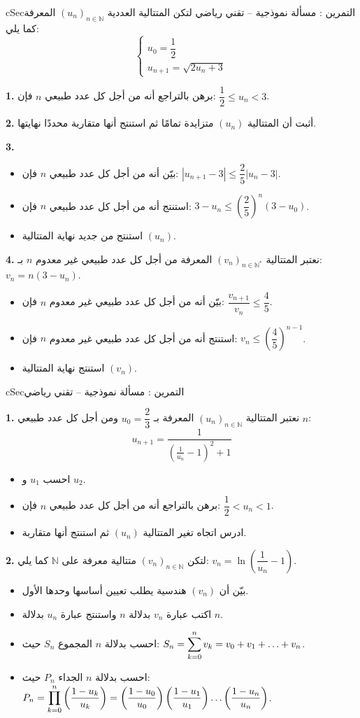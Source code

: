 \documentclass[12pt,a4paper]{article}
\newenvironment{BOX}[2]{\begin{otherlanguage}{english}\begin{arbox}{#1}{#2}}{\end{arbox}\end{otherlanguage}}
\newcounter{exo}
\newenvironment{tamrin}[1]{\stepcounter{exo}\begin{BOX}{cSec}{التمرين \theexo: #1}}{\end{BOX}}
\renewcommand{\dots}{\mathinner{\ldotp\ldotp\ldotp}}
\newcommand{\N}{\mathbb{N}}
\newenvironment{sq}{\begin{itemize}[leftmargin=2.4em,itemsep=3pt]}{\end{itemize}}
\newcommand{\qa}{\item[(أ)]}\newcommand{\qb}{\item[(ب)]}\newcommand{\qc}{\item[(جـ)]}\newcommand{\qd}{\item[(د)]}\newcommand{\qe}{\item[(هـ)]}
\newcommand{\QQ}[1]{\par\smallskip\textbf{#1.} }
\begin{document}
\begin{tamrin}{مسألة نموذجية -- تقني رياضي}
لتكن المتتالية العددية $(u_n)_{n\in\N}$ المعرفة كما يلي:
\[\begin{cases} u_0=\dfrac12\\[4pt] u_{n+1}=\sqrt{2u_n+3}\end{cases}\]
\QQ{1} برهن بالتراجع أنه من أجل كل عدد طبيعي $n$ فإن: $\dfrac12\le u_n<3$.

\QQ{2} أثبت أن المتتالية $(u_n)$ متزايدة تمامًا ثم استنتج أنها متقاربة محددًا نهايتها.

\QQ{3}
\begin{sq}
\qa بيّن أنه من أجل كل عدد طبيعي $n$ فإن: $|u_{n+1}-3|\le \dfrac25|u_n-3|$.
\qb استنتج أنه من أجل كل عدد طبيعي $n$ فإن: $3-u_n\le\left(\dfrac25\right)^n(3-u_0)$.
\qc استنتج من جديد نهاية المتتالية $(u_n)$.
\end{sq}
\QQ{4} نعتبر المتتالية $(v_n)_{n\in\N^*}$ المعرفة من أجل كل عدد طبيعي غير معدوم $n$ بـ: $v_n=n(3-u_n)$.
\begin{sq}
\qa بيّن أنه من أجل كل عدد طبيعي غير معدوم $n$ فإن: $\dfrac{v_{n+1}}{v_n}\le\dfrac45$.
\qb استنتج أنه من أجل كل عدد طبيعي غير معدوم $n$ فإن: $v_n\le\left(\dfrac45\right)^{n-1}$.
\qc استنتج نهاية المتتالية $(v_n)$.
\end{sq}
\end{tamrin}

\begin{tamrin}{مسألة نموذجية -- تقني رياضي}
\QQ{1} نعتبر المتتالية $(u_n)_{n\in\N}$ المعرفة بـ $u_0=\dfrac23$ ومن أجل كل عدد طبيعي $n$:
\[u_{n+1}=\frac{1}{\left(\frac{1}{u_n}-1\right)^2+1}\]
\begin{sq}
\qa احسب $u_1$ و $u_2$.
\qb برهن بالتراجع أنه من أجل كل عدد طبيعي $n$ فإن: $\dfrac12<u_n<1$.
\qc ادرس اتجاه تغير المتتالية $(u_n)$ ثم استنتج أنها متقاربة.
\end{sq}
\QQ{2} لتكن $(v_n)_{n\in\N}$ متتالية معرفة على $\N$ كما يلي: $v_n=\ln\left(\dfrac{1}{u_n}-1\right)$.
\begin{sq}
\qa بيّن أن $(v_n)$ هندسية يطلب تعيين أساسها وحدها الأول.
\qb اكتب عبارة $v_n$ بدلالة $n$ واستنتج عبارة $u_n$ بدلالة $n$.
\qc احسب بدلالة $n$ المجموع $S_n$ حيث: $S_n=\displaystyle\sum_{k=0}^{n}v_k=v_0+v_1+\dots+v_n$.
\qd احسب بدلالة $n$ الجداء $P_n$ حيث: $P_n=\displaystyle\prod_{k=0}^{n}\left(\frac{1-u_k}{u_k}\right)=\left(\frac{1-u_0}{u_0}\right)\left(\frac{1-u_1}{u_1}\right)\dots\left(\frac{1-u_n}{u_n}\right)$.
\end{sq}
\end{tamrin}
\end{document}
